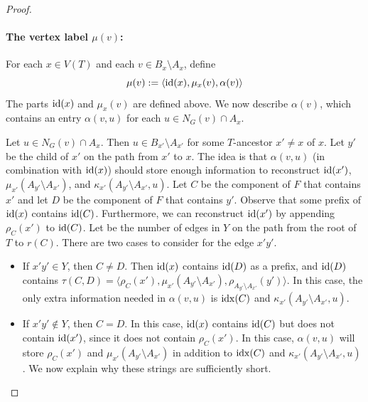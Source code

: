 \begin{proof}
  \paragraph{\boldmath The vertex label $\mu(v)$:}

  For each $x\in V(T)$ and each $v\in B_x\setminus A_x$, define
  \[
    \mu(v) := \langle \operatorname{id}(x), \mu_x(v),\alpha(v)\rangle
  \]
  The parts $\operatorname{id}(x)$ and $\mu_x(v)$ are defined above. We now describe $\alpha(v)$, which contains an entry $\alpha(v,u)$ for each $u\in N_G(v)\cap A_x$.  
  
  
  Let $u\in N_G(v)\cap A_x$.  Then $u\in B_{x'}\setminus A_{x'}$ for some $T$-ancestor $x'\neq x$ of $x$. Let $y'$ be the child of $x'$ on the path from $x'$ to $x$. The idea is that $\alpha(v,u)$ (in combination with $\operatorname{id}(x)$) should store enough information to reconstruct $\operatorname{id}(x')$, $\mu_{x'}(A_{y'}\setminus A_{x'})$, and $\kappa_{x'}(A_{y'}\setminus A_{x'},u)$.  Let $C$ be the component of $F$ that contains $x'$ and let $D$ be the component of $F$ that contains $y'$.  Observe that some prefix of $\operatorname{id}(x)$ contains $\operatorname{id}(C)$.  Furthermore, we can reconstruct $\operatorname{id}(x')$ by appending $\rho_C(x')$ to $\operatorname{id}(C)$.  Let  be the number of edges in $Y$ on the path from the root of $T$ to $r(C)$. There are two cases to consider for the edge $x'y'$.   
  \begin{itemize}
    \item If $x'y'\in Y$, then $C\neq D$.  Then $\operatorname{id}(x)$ contains $\operatorname{id}(D)$ as a prefix, and $\operatorname{id}(D)$ contains $\tau(C,D)=\langle \rho_C(x'), \mu_{x'}(A_{y'}\setminus A_{x'}), \rho_{A_{y'}\setminus A_{x'}}(y') \rangle$.  In this case, the only extra information needed in $\alpha(v,u)$ is $\operatorname{idx}(C)$ and $\kappa_{x'}(A_{y'}\setminus A_{x'}, u)$.  

    \item If $x'y'\not\in Y$, then $C=D$. In this case, $\operatorname{id}(x)$ contains $\operatorname{id}(C)$ but does not contain $\operatorname{id}(x')$, since it does not contain $\rho_C(x')$.  In this case, $\alpha(v,u)$ will store $\rho_C(x')$ and $\mu_{x'}(A_{y'}\setminus A_{x'})$ in addition to $\operatorname{idx}(C)$ and $\kappa_{x'}(A_{y'}\setminus A_{x'}, u)$.  We now explain why these strings are sufficiently short.
    

\end{itemize}
\end{proof}
